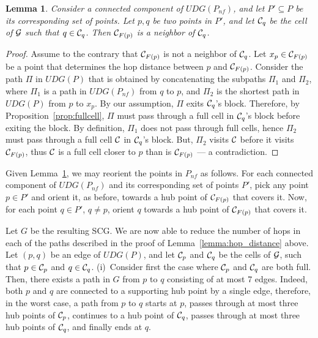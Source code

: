 \documentclass[11pt,letter]{article}
\newtheorem{corollary}[theorem]{Corollary}
\newtheorem{lemma}[theorem]{Lemma}
\newcommand{\old}[1]{{{}}}
\def\clst#1{{\C_{{{F}}({{#1}})}}}
\def\C{{\cal{C}}}
\def\grid{{\cal{G}}}
\def\graph{{{G}}}
\def\UDG{{U\!DG}}
\def\nf{{n\!f}}
\begin{document}
\begin{lemma}
\label{lemma:full_super_neighbor}
Consider a connected component of $\UDG(P_{\nf})$, and let $P' \subseteq P$ be its corresponding set of points.
Let $p,q$ be two points in $P'$, and let $\C_q$ be the cell of $\grid$ such that $q \in \C_q$.
Then $\clst{p}$ is a neighbor of $\C_q$.
\end{lemma}
\begin{proof}
Assume to the contrary that $\clst{p}$ is not a neighbor of $\C_q$.
Let $x_p \in \clst{p}$ be a point that determines the hop distance between $p$ and $\clst{p}$.
Consider the path $\Pi$ in $\UDG(P)$ that is obtained by concatenating the subpaths $\Pi_1$ and $\Pi_2$,
where $\Pi_1$ is a path in $\UDG(P_{\nf})$ from $q$ to $p$,
and $\Pi_2$ is the shortest path in $\UDG(P)$ from $p$ to $x_p$.
By our assumption, $\Pi$ exits $\C_q$'s block.
Therefore, by Proposition~\ref{prop:fullcell}, $\Pi$ must pass through a full cell in $\C_q$'s block before exiting the block.
By definition, $\Pi_1$ does not pass through full cells, hence $\Pi_2$ must pass through a full cell $\C$ in $\C_q$'s block.
But, $\Pi_2$ visits $\C$ before it visits $\clst{p}$, thus $\C$ is a full cell closer to $p$ than is $\clst{p}$
--- a contradiction.
\end{proof}

\old{
\begin{corollary}
\label{col:super_neighbor_full_cell}
Let $P' \subseteq P$ corresponds to a connected component of $\UDG(\nf)$,
and let $p \in P'$ be an arbitrary point.
Then, for any $q \in P'$, the cell of $\grid$ containing $q$ is a neighbor of $\clst{p}$.
\end{corollary}
}

Given Lemma~\ref{lemma:full_super_neighbor}, we may reorient the points in $P_{\nf}$ as follows.
For each connected component of $\UDG(P_{\nf})$ and its corresponding set of points $P'$, pick any point $p \in P'$ and orient it,
as before, towards a hub point of $\clst{p}$ that covers it. Now, for each point $q \in P'$, $q \ne p$, orient $q$ towards a hub point
of $\clst{p}$ that covers it.

Let $\graph$ be the resulting SCG.
We are now able to reduce the number of hops in each of the paths described in the proof of Lemma~\ref{lemma:hop_distance} above.
Let $(p,q)$ be an edge of $\UDG(P)$, and let $\C_p$ and $\C_q$ be the cells of $\grid$, such that $p \in \C_p$ and $q \in \C_q$.
(i)~Consider first the case where $\C_p$ and $\C_q$ are both full.
Then, there exists a path in $\graph$ from $p$ to $q$ consisting of at most 7 edges.
Indeed, both $p$ and $q$ are connected to a supporting hub point by a single edge,
therefore, in the worst case, a path from $p$ to $q$ starts at $p$, passes through
at most three hub points of $\C_p$,
continues to a hub point of $\C_q$,
passes through at most three hub points of $\C_q$,
and finally ends at $q$.
\end{document}
